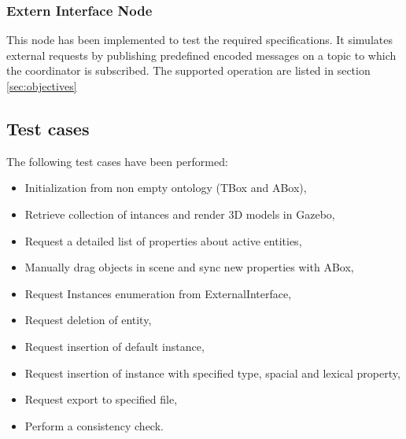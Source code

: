 \subsubsection{Extern Interface Node}
This node has been implemented to test the required specifications. It simulates external requests by publishing predefined encoded messages on a topic to which the coordinator is subscribed. The supported operation are listed in section \ref{sec:objectives}

\subsection{Test cases}

The following test cases have been performed:

\begin{itemize}
\item Initialization from non empty ontology (TBox and ABox),
\item Retrieve collection of intances and render 3D models in Gazebo,
\item Request a detailed list of properties about active entities,
\item Manually drag objects in scene and sync new properties with ABox,
\item Request Instances enumeration from ExternalInterface,
\item Request deletion of entity,
\item Request insertion of default instance,
\item Request insertion of instance with specified type, spacial and lexical property,
\item Request export to specified file,
\item Perform a consistency check.
\end{itemize}